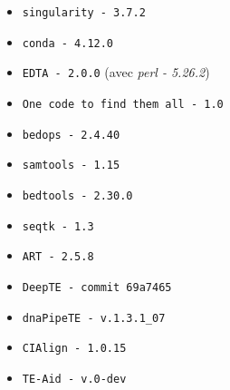 \documentclass[10pt]{article}
\begin{document}
\begin{itemize}
\begin{itemize}
\begin{itemize}
        \end{itemize}
    \end{itemize}
    \item \texttt{singularity - 3.7.2}
    \item \texttt{conda - 4.12.0}
    \item \texttt{EDTA - 2.0.0} (avec \textit{perl - 5.26.2})
    \item \texttt{One code to find them all - 1.0}
    \item \texttt{bedops - 2.4.40}
    \item \texttt{samtools - 1.15}
    \item \texttt{bedtools - 2.30.0}
    \item \texttt{seqtk - 1.3}
    \item \texttt{ART - 2.5.8}
    \item \texttt{DeepTE - commit 69a7465}
    \item \texttt{dnaPipeTE - v.1.3.1\_07}
    \item \texttt{CIAlign - 1.0.15}
    \item \texttt{TE-Aid - v.0-dev}
\end{itemize}
\end{document}
